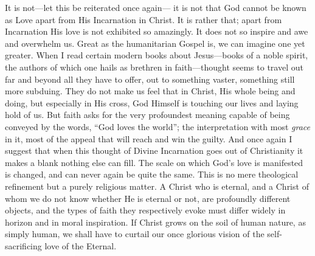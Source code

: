 \documentclass[12pt,a5paper,oneside]{book}
\begin{document}
It is not---let this be reiterated once again---
it is not that God cannot be known as Love
apart from His Incarnation in Christ. It is
rather that; apart from Incarnation His love
is not exhibited so amazingly. It does not so
inspire and awe and overwhelm us. Great
as the humanitarian Gospel is, we can imagine
one yet greater. When I read certain modern
books about Jesus---books of a noble spirit,
the authors of which one hails as brethren
in faith---thought seems to travel out far and
beyond all they have to offer, out to something
vaster, something still more subduing. They do
not make us feel that in Christ, His whole
being and doing, but especially in His cross,
God Himself is touching our lives and laying
hold of us. But faith asks for the very profoundest
meaning capable of being conveyed
by the words, ``God loves the world''; the
interpretation with most \textit{grace} in it, most of the
appeal that will reach and win the guilty.
And once again I suggest that when this thought
of Divine Incarnation goes out of Christianity
it makes a blank nothing else can fill. The
scale on which God's love is manifested is
changed, and can never again be quite the same.
This is no mere theological refinement but a
purely religious matter. A Christ who is
eternal, and a Christ of whom we do not know
whether He is eternal or not, are profoundly
different objects, and the types of faith they
respectively evoke must differ widely in horizon
and in moral inspiration. If Christ grows on the
soil of human nature, as simply human, we shall
have to curtail our once glorious vision of the
self-sacrificing love of the Eternal.
\end{document}
